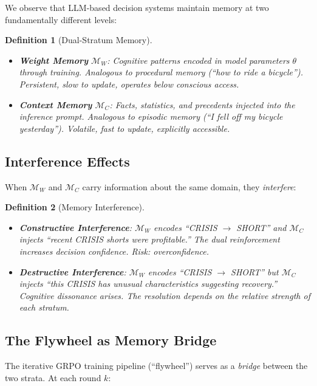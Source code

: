 \documentclass[11pt, a4paper]{article}
\newtheorem{definition}{Definition}
\begin{document}
We observe that LLM-based decision systems maintain memory at two fundamentally different levels:

\begin{definition}[Dual-Stratum Memory]
\begin{itemize}
  \item \textbf{Weight Memory} $\mathcal{M}_W$: Cognitive patterns encoded in model parameters $\theta$ through training. Analogous to procedural memory (``how to ride a bicycle''). Persistent, slow to update, operates below conscious access.
  
  \item \textbf{Context Memory} $\mathcal{M}_C$: Facts, statistics, and precedents injected into the inference prompt. Analogous to episodic memory (``I fell off my bicycle yesterday''). Volatile, fast to update, explicitly accessible.
\end{itemize}
\end{definition}

\subsection{Interference Effects}

When $\mathcal{M}_W$ and $\mathcal{M}_C$ carry information about the same domain, they \emph{interfere}:

\begin{definition}[Memory Interference]
\begin{itemize}
  \item \textbf{Constructive Interference}: $\mathcal{M}_W$ encodes ``CRISIS $\to$ SHORT'' and $\mathcal{M}_C$ injects ``recent CRISIS shorts were profitable.'' The dual reinforcement increases decision confidence. Risk: overconfidence.
  
  \item \textbf{Destructive Interference}: $\mathcal{M}_W$ encodes ``CRISIS $\to$ SHORT'' but $\mathcal{M}_C$ injects ``this CRISIS has unusual characteristics suggesting recovery.'' Cognitive dissonance arises. The resolution depends on the relative \emph{strength} of each stratum.
\end{itemize}
\end{definition}

\subsection{The Flywheel as Memory Bridge}

The iterative GRPO training pipeline (``flywheel'') serves as a \emph{bridge} between the two strata. At each round $k$:
\end{document}
